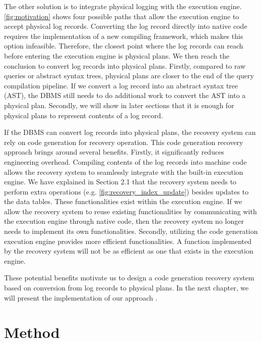 \documentclass[12pt]{cmuthesis}
\begin{document}
The other solution is to integrate physical logging with the execution engine. \cref{fig:motivation} shows four possible paths that allow the execution engine to accept physical log records. Converting the log record directly into native code requires the implementation of a new compiling framework, which makes this option infeasible. Therefore, the closest point where the log records can reach before entering the execution engine is physical plans. We then reach the conclusion to convert log records into physical plans. Firstly, compared to raw queries or abstract syntax trees, physical plans are closer to the end of the query compilation pipeline. If we convert a log record into an abstract syntax tree (AST), the DBMS still needs to do additional work to convert the AST into a physical plan. Secondly, we will show in later sections that it is enough for physical plans to represent contents of a log record.

If the DBMS can convert log records into physical plans, the recovery system can rely on code generation for recovery operation. This code generation recovery approach brings around several benefits. Firstly, it significantly reduces engineering overhead. Compiling contents of the log records into machine code allows the recovery system to seamlessly integrate with the built-in execution engine. We have explained in Section 2.1 that the recovery system needs to perform extra operations (e.g. \cref{fig:recovery_index_update}) besides updates to the data tables. These functionalities exist within the execution engine. If we allow the recovery system to reuse existing functionalities by communicating with the execution engine through native code, then the recovery system no longer needs to implement its own functionalities. Secondly, utilizing the code generation execution engine provides more efficient functionalities. A function implemented by the recovery system will not be as efficient as one that exists in the execution engine.

These potential benefits motivate us to design a code generation recovery system based on conversion from log records to physical plans. In the next chapter, we will present the implementation of our approach .

\chapter{Method}
\end{document}
